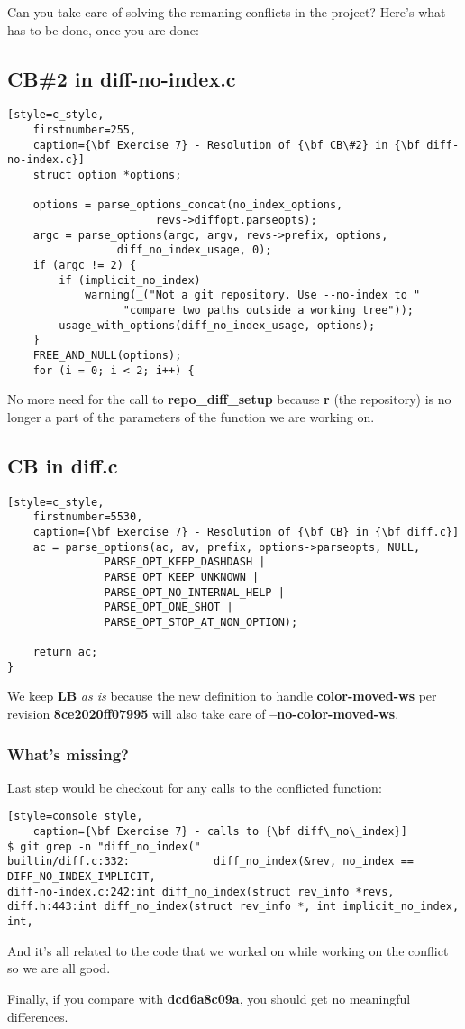 Can you take care of solving the remaning conflicts in the project? Here's what has to be done, once you are done:

\subsection*{CB\#2 in diff-no-index.c}
\begin{lstlisting}[style=c_style,
	firstnumber=255,
	caption={\bf Exercise 7} - Resolution of {\bf CB\#2} in {\bf diff-no-index.c}]
	struct option *options;

	options = parse_options_concat(no_index_options,
				       revs->diffopt.parseopts);
	argc = parse_options(argc, argv, revs->prefix, options,
			     diff_no_index_usage, 0);
	if (argc != 2) {
		if (implicit_no_index)
			warning(_("Not a git repository. Use --no-index to "
				  "compare two paths outside a working tree"));
		usage_with_options(diff_no_index_usage, options);
	}
	FREE_AND_NULL(options);
	for (i = 0; i < 2; i++) {
\end{lstlisting}

No more need for the call to {\bf repo\_diff\_setup} because {\bf r} (the repository) is no longer a part of the
parameters of the function we are working on.

\subsection*{CB in diff.c}

\begin{lstlisting}[style=c_style,
	firstnumber=5530,
	caption={\bf Exercise 7} - Resolution of {\bf CB} in {\bf diff.c}]
	ac = parse_options(ac, av, prefix, options->parseopts, NULL,
			   PARSE_OPT_KEEP_DASHDASH |
			   PARSE_OPT_KEEP_UNKNOWN |
			   PARSE_OPT_NO_INTERNAL_HELP |
			   PARSE_OPT_ONE_SHOT |
			   PARSE_OPT_STOP_AT_NON_OPTION);

	return ac;
}
\end{lstlisting}

We keep {\bf LB} {\it as is} because the new definition to handle {\bf color-moved-ws} per revision {\bf 8ce2020ff07995} will
also take care of {\bf --no-color-moved-ws}.

\subsubsection{What's missing?}
Last step would be checkout for any calls to the conflicted function:

\begin{lstlisting}[style=console_style,
	caption={\bf Exercise 7} - calls to {\bf diff\_no\_index}]
$ git grep -n "diff_no_index("
builtin/diff.c:332:             diff_no_index(&rev, no_index == DIFF_NO_INDEX_IMPLICIT, 
diff-no-index.c:242:int diff_no_index(struct rev_info *revs,
diff.h:443:int diff_no_index(struct rev_info *, int implicit_no_index, int,
\end{lstlisting}

And it's all related to the code that we worked on while working on the conflict so we are all good.

Finally, if you compare with {\bf dcd6a8c09a}, you should get no meaningful differences.

